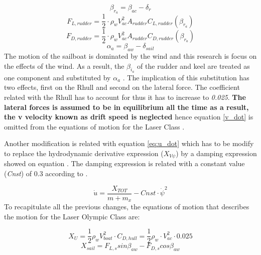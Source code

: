 \begin{equation} \label{eq:angle_attack_rudder}
    \beta_{r_{a}} = \beta_{ac} - \delta_{r}
\end{equation}
\begin{equation} \label{eq:rudder_lift}
    F_{L,rudder}=\frac{1}{2} \cdot \rho_{w} V_{ac}^2 A_{rudder}C_{L,rudder}(\beta_{r_{a}})
\end{equation}
\begin{equation} \label{eq:rudder_drag}
    F_{D,rudder}=\frac{1}{2} \cdot \rho_{w} V_{ac}^2 A_{rudder}C_{D,rudder}(\beta_{r_{a}})
\end{equation}
\begin{equation} \label{eq:angle_attack_sail}
    \alpha_{a} = \beta_{aw} - \delta_{sail}
\end{equation}
The motion of the sailboat is dominated by the wind and this research is focus on the effects of the wind. As a result, the $\beta_{i_{a}}$ of the rudder and keel are treated as one component and substituted by $\alpha_{a}$ \cite{rein2012tra}. The implication of this substitution has two effects, first on the \acrshort{Rhull} and second on the lateral force. The coefficient related with the \acrshort{Rhull} has to account for thus it has to increase to \textit{0.025}. \textbf{The lateral forces is assumed to be in equilibrium all the time as a result, the \acrshort{v} velocity known as drift speed is neglected} hence equation \ref{v_dot} is omitted from the equations of motion for the Laser Class \cite{rein2012tra}.\par  
Another modification is related with equation \ref{eq:u_dot} which has to be modify to replace the hydrodynamic derivative expression ($X_{V\psi}$) by a damping expression showed on equation \label{eq:u_dotLaser}. The damping expression is related with a constant value  (\textit{Cnst}) of 0.3 according to \cite{rein2012tra}. \par
\begin{equation} \label{eq:u_dotLaserM}
    \Dot{u}=\frac{X_{TOT}}{m+m_{x}}-Cnst \cdot \Dot{\psi}^2
\end{equation}
To recapitulate all the previous changes, the equations of motion that describes the motion for the Laser Olympic Class are: \par 
\begin{equation} \label{eq:X_uM}
    X_{U}=\frac{1}{2}\rho_{w}V_{boat}^2 \cdot C_{D,hull}=\frac{1}{2}\rho_{w} \cdot V_{ac}^2 \cdot 0.025 
\end{equation}
\begin{equation}\label{eq:X_sailM}
       X_{sail}=F_{L,s}sin\beta_{aw}-F_{D,s}cos\beta_{aw} 
\end{equation}
